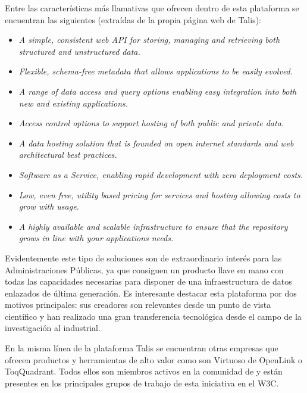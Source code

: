 Entre las características más llamativas que ofrecen dentro de esta plataforma se encuentran las
siguientes (extraídas de la propia página web de Talis):

\begin{itemize}
    \item \textit{A simple, consistent web API for storing, managing and retrieving both structured and unstructured data.}
    \item \textit{Flexible, schema-free metadata that allows applications to be easily evolved.}
    \item \textit{A range of data access and query options enabling easy integration into both new and existing applications.}
    \item \textit{Access control options to support hosting of both public and private data.}
    \item \textit{A data hosting solution that is founded on open internet standards and web architectural best practices.}
    \item \textit{Software as a Service, enabling rapid development with zero deployment costs.}
    \item \textit{Low, even free, utility based pricing for services and hosting allowing costs to grow with usage.}
    \item \textit{A highly available and scalable infrastructure to ensure that the repository grows in line with your applications needs.}
\end{itemize}

Evidentemente este tipo de soluciones son de extraordinario interés para las Administraciones Públicas, ya que consiguen
un producto llave en mano con todas las capacidades necesarias para disponer de una infraestructura de datos
enlazados de última generación. Es interesante destacar esta plataforma por dos motivos principales: sus creadores
son relevantes desde un punto de vista científico y han realizado una gran transferencia tecnológica desde
el campo de la investigación al industrial.

En la misma línea de la plataforma Talis se encuentran otras empresas que ofrecen productos y herramientas
de alto valor como son Virtuoso de OpenLink o ToqQuadrant. Todos ellos son miembros activos en la comunidad
de \linkeddata y están presentes en los principales grupos de trabajo de esta iniciativa en el \gls{W3C}.
 
